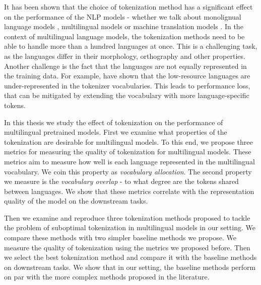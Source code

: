 It has been shown that the choice of tokenization method has a significant effect on the performance of the NLP models - whether we talk about monolignual language models \cite{bostrom_byte_2020}, multilingual models \cite{rust_how_2021} or machine translation models \cite{kudo_sentencepiece_2018,gowda_finding_2020}. In the context of multilingual language models, the tokenization methods need to be able to handle more than a hundred languages at once. This is a challenging task, as the languages differ in their morphology, orthography and other properties. Another challenge is the fact that the languages are not equally represented in the training data. For example,  have shown that the low-resource languages are under-represented in the tokenizer vocabularies. This leads to performance loss, that can be mitigated by extending the vocabulary with more language-specific tokens. \cite{rust_how_2021}

In this thesis we study the effect of tokenization on the performance of multilingual pretrained models. First we examine what properties of the tokenization are desirable for multilingual models. To this end, we propose three metrics for measuring the quality of tokenization for multilingual models. These metrics aim to measure how well is each language represented in the multilingual vocabulary. We coin this property as \textit{vocabulary allocation}. The second property we measure is the \textit{vocabulary overlap} - to what degree are the tokens shared between languages. We show that these metrics correlate with the representation quality of the model on the downstream tasks. 

Then we examine and reproduce three tokenization methods \citep{chung_improving_2020,zheng_allocating_2021,liang_xlm-v_2023} proposed to tackle the problem of suboptimal tokenization in multilingual models in our setting. We compare these methods with two simpler baseline methods we propose. We measure the quality of tokenization using the metrics we proposed before. Then we select the best tokenization method and compare it with the baseline methods on downstream tasks. We show that in our setting, the baseline methods perform on par with the more complex methods proposed in the literature.


